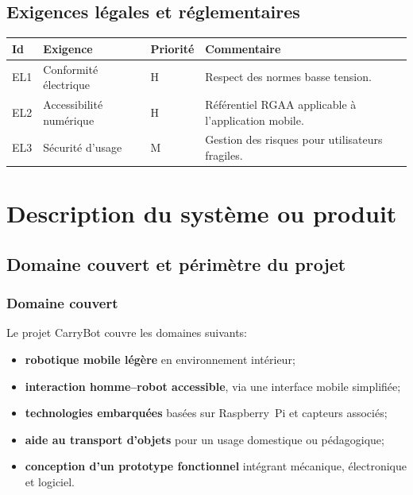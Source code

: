 \documentclass[12pt,a4paper]{article}
\begin{document}
\vspace{0.6cm}

\subsection{Exigences légales et réglementaires}

\begin{tabular}{|p{1.3cm}|p{6.6cm}|p{1.7cm}|p{4.5cm}|}
\hline
\textbf{Id} & \textbf{Exigence} & \textbf{Priorité} & \textbf{Commentaire} \\ \hline

EL1 & Conformité électrique & H & Respect des normes basse tension. \\ \hline

EL2 & Accessibilité numérique & H & Référentiel RGAA applicable à l’application mobile. \\ \hline

EL3 & Sécurité d’usage & M & Gestion des risques pour utilisateurs fragiles. \\ \hline

\end{tabular}

\section{Description du système ou produit}
\subsection{Domaine couvert et périmètre du projet}

\subsubsection{Domaine couvert}
Le projet CarryBot couvre les domaines suivants:
\begin{itemize}
    \item \textbf{robotique mobile légère} en environnement intérieur;
    \item \textbf{interaction homme--robot accessible}, via une interface mobile simplifiée;
    \item \textbf{technologies embarquées} basées sur Raspberry~Pi et capteurs associés;
    \item \textbf{aide au transport d’objets} pour un usage domestique ou pédagogique;
    \item \textbf{conception d’un prototype fonctionnel} intégrant mécanique, électronique et logiciel.
\end{itemize}
\end{document}
